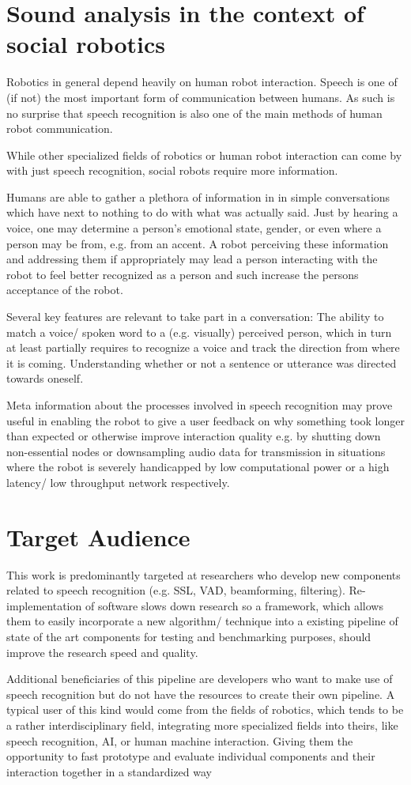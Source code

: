 \section{Sound analysis in the context of social robotics}
Robotics in general depend heavily on human robot interaction. Speech is one of (if not) the most important form of communication between humans. As such is no surprise that speech recognition is also one of the main methods of human robot communication.

While other specialized fields of robotics or human robot interaction can come by with just speech recognition, social robots require more information.

Humans are able to gather a plethora of information in in simple conversations which have next to nothing to do with what was actually said. Just by hearing a voice, one may determine a person’s emotional state, gender, or even where a person may be from, e.g. from an accent. A robot perceiving these information and addressing them if appropriately may lead a person interacting with the robot to feel better recognized as a person and such increase the persons acceptance of the robot.

Several key features are relevant to take part in a conversation: The ability to match a voice/ spoken word to a (e.g. visually) perceived person, which in turn at least partially requires to recognize a voice and track the direction from where it is coming. Understanding whether or not a sentence or utterance was directed towards oneself.

Meta information about the processes involved in speech recognition may prove useful in enabling the robot to give a user feedback on why something took longer than expected or otherwise improve interaction quality e.g. by shutting down non-essential nodes or downsampling audio data for transmission in situations where the robot is severely handicapped by low computational power or a high latency/ low throughput network respectively.

\section{Target Audience}

This work is predominantly targeted at researchers who develop new components related to speech recognition (e.g. SSL, VAD, beamforming, filtering). 
Re-implementation of software slows down research so a framework, which allows them to easily incorporate a new algorithm/ technique into a existing pipeline of state of the art components for testing and benchmarking purposes, should improve the research speed and quality.

Additional beneficiaries of this pipeline are developers who want to make use of speech recognition but do not have the resources to create their own pipeline.
A typical user of this kind would come from the fields of robotics, which tends to be a rather interdisciplinary field, integrating more specialized fields into theirs, like speech recognition, AI, or human machine interaction.
Giving them the opportunity to fast prototype and evaluate individual components and their interaction together in a standardized way 